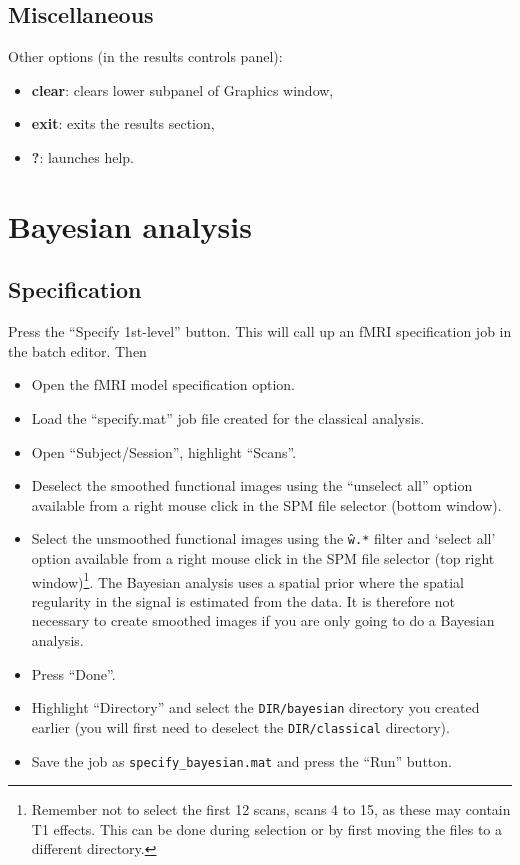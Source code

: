 \subsection{Miscellaneous}

Other options (in the results controls panel):

\begin{itemize}
\item \textbf{clear}: clears lower subpanel of Graphics window,
\item \textbf{exit}: exits the results section,
\item \textbf{?}: launches help.
\end{itemize}

\section{Bayesian analysis}

\subsection{Specification}

Press the ``Specify 1st-level'' button. This will call up an fMRI specification job in the batch editor. Then

\begin{itemize}
\item Open the fMRI model specification option.
\item Load the ``specify.mat'' job file created for the classical analysis.
\item Open ``Subject/Session'', highlight ``Scans''.
\item Deselect the smoothed functional images using the ``unselect all'' option available from a right mouse click in the SPM file selector (bottom window).
\item Select the unsmoothed functional images using the \texttt{\^w.*} filter and `select all' option available from a right mouse click in the SPM file selector (top right window)\footnote{Remember not to select the first 12 scans, scans 4 to 15, as these may contain T1 effects. This can be done during selection or by first moving the files to a different directory.}. The Bayesian analysis uses a spatial prior where the spatial regularity in the signal is estimated from the data. It is therefore not necessary to create smoothed images if you are only going to do a Bayesian analysis.
\item Press ``Done''.
\item Highlight ``Directory'' and select the \texttt{DIR/bayesian} directory you created earlier (you will first need to deselect the \texttt{DIR/classical} directory).
\item Save the job as \texttt{specify\_bayesian.mat} and press the ``Run'' button.
\end{itemize}

